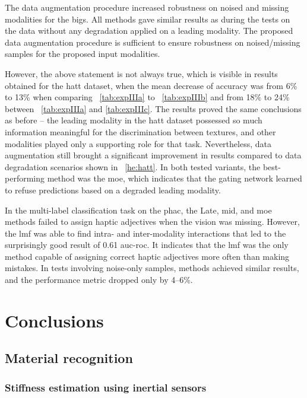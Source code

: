 \documentclass[a4paper, 10pt, twoside]{report}
\begin{document}
The data augmentation procedure increased robustness on noised and missing modalities for the \acrshort{bigs}. All methods gave similar results as during the tests on the data without any degradation applied on a leading modality. The proposed data augmentation procedure is sufficient to ensure robustness on noised/missing samples for the proposed input modalities. 

However, the above statement is not always true, which is visible in results obtained for the \acrshort{hatt} dataset, when the mean decrease of accuracy was from 6\% to 13\% when comparing \Table~\ref{tab:expIIIa} to \Table~\ref{tab:expIIIb} and from 18\% to 24\% between \Table~\ref{tab:expIIIa} and \ref{tab:expIIIc}. The results proved the same conclusions as before -- the leading modality in the \acrshort{hatt} dataset possessed so much information meaningful for the discrimination between textures, and other modalities played only a supporting role for that task. Nevertheless, data augmentation still brought a significant improvement in results compared to data degradation scenarios shown in \Table~\ref{he:hatt}. In both tested variants, the best-performing method was the \acrshort{moe}, which indicates that the gating network learned to refuse predictions based on a degraded leading modality.

In the multi-label classification task on the \acrshort{phac}, the Late, \acrshort{mid}, and \acrshort{moe} methods failed to assign haptic adjectives when the vision was missing. However, the \acrshort{lmf} was able to find intra- and inter-modality interactions that led to the surprisingly good result of 0.61 \acrshort{auc}-\acrshort{roc}. It indicates that the \acrshort{lmf} was the only method capable of assigning correct haptic adjectives more often than making mistakes. In tests involving noise-only samples, methods achieved similar results, and the performance metric dropped only by 4--6\%. 

\part{Conclusions}
\label{part:conclusions}

\chapter{Material recognition}
\label{part:conclusions:material}

\section{Stiffness estimation using inertial sensors}
\end{document}
